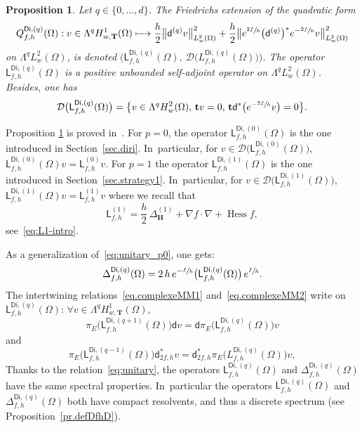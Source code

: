 \documentclass[JEP,XML,SOM,Unicode,NoEqCountersInSection,NoFloatCountersInSection,published]{cedram}
\newcommand\mto{\mathchoice{\longmapsto}{\mapsto}{\mapsto}{\mapsto}}
\newcommand{\mbf}[1]{\mathbf{#1}}
\DeclareMathOperator{\hess}{Hess}\let\Hess\hess
\theoremstyle{plain}
\newtheorem{proposition}{Proposition}
\theoremstyle{definition}
\begin{document}
\begin{proposition} \label{Lp}
Let $q\in \{0,\ldots,d\}$.
The Friedrichs extension of the quadratic form
\[
Q_{f,h}^{\mathsf{Di},(q)}(\Omega): v \in \Lambda^q H^1_{w,\mbf T}(\Omega)\mto \frac{h}{2}
\big\Vert \mathsf d^{(q)}v\big \Vert_{ L^2_w(\Omega)}^2
+\frac{h}{2}\big \Vert
e^{\sfrac{2f}{h}} \bigl(\mathsf d^{(q)}\bigr)^* e^{-\sfrac{2f}{h}} v\big \Vert_{ L^2_w(\Omega)}^2
\]
on $\Lambda^qL^2_w(\Omega)$, is denoted
$\bigl(\mathsf L^{\mathsf{Di},(q)}_{f,h}(\Omega), \ \mathcal
D\bigl(L^{\mathsf{Di},(q)}_{f,h}(\Omega)\bigr)\bigr)$. The operator $\mathsf L^{\mathsf{Di},(q)}_{f,h}(\Omega)$ is a positive unbounded self-adjoint operator on $\Lambda^qL^2_w(\Omega)$. Besides, one has
\[
\mathcal D\bigl(\mathsf L^{\mathsf{Di},(q)}_{f,h}(\Omega)\bigr)=\big\{ v \in \Lambda^qH^2_w(\Omega),\, \mbf tv=0, \, \mbf t \mathsf d^*\bigl(e^{-\sfrac{2f}{h}}v\bigr)=0 \big\}.
\]
\end{proposition}

Proposition \ref{Lp} is proved in~\cite[\S2.4]{helffer-nier-06}.
For $p=0$, the operator $\mathsf L^{\mathsf{Di},(0)}_{f,h}(\Omega)$
is the one introduced in Section~\ref{sec.diri}. In~particular,
for $v\in \mathcal D\bigl(\mathsf L^{\mathsf{Di},(0)}_{f,h}(\Omega)\bigr)$,
$\mathsf L_{f,h}^{\mathsf{Di}, (0)}(\Omega)v = \mathsf L_{f,h}^{ (0)}v$.
For $p=1$ the operator $\mathsf L^{\mathsf{Di},(1)}_{f,h}(\Omega)$ is the one introduced in Section~\ref{sec.strategy1}. In~particular,
for $v\in \mathcal D\bigl(\mathsf L^{\mathsf{Di},(1)}_{f,h}(\Omega)\bigr)$,
$\mathsf L_{f,h}^{\mathsf{Di}, (1)} (\Omega)v = \mathsf L_{f,h}^{(1)} v$
where we recall that
\[
\mathsf L_{f,h}^{(1)} = \frac{h}{2}\,
\Delta^{(1)}_{\mbf H} + \nabla f \cdot \nabla + \hess f,
\]
see~\eqref{eq:L1-intro}.

As a generalization of~\eqref{eq:unitary_p0}, one gets:
\begin{equation}\label{eq:unitary}
\Delta^{\mathsf{Di},(q)}_{f,h}(\Omega) = 2\, h \, e^{-\sfrac{f}{h}} \bigl(\mathsf L^{\mathsf{Di},(q)}_{f,h}(\Omega) \bigr)\, e^{\sfrac{f}{h}}.
\end{equation}
The intertwining relations~\eqref{eq.complexeMM1} and~\eqref{eq.complexeMM2}
write on $\mathsf L_{f,h}^{\mathsf{Di},(q)}(\Omega)$: $\forall v\in \Lambda^q H^1_{w,\mbf T}(\Omega)$,
\begin{equation}\label{commutationL}
\pi_{E}\bigl(\mathsf L_{f,h}^{\mathsf{Di},(q+1)}(\Omega))\mathsf dv =\mathsf d \pi_{E}\bigl(\mathsf L_{f,h}^{\mathsf{Di},(q)}(\Omega))v
\end{equation}
and
\begin{equation}\label{commutationL2}
\pi_{E}\bigl(\mathsf L_{f,h}^{\mathsf{Di},(q-1)}(\Omega) \bigr)\mathsf d_{2f,h}^{*} v= \mathsf d^{*}_{2f,h} \pi_{E}\bigl(L_{f,h}^{\mathsf{Di},(q)}(\Omega)\bigr)v,
\end{equation}
Thanks to the relation~\eqref{eq:unitary}, the operators
$\mathsf L_{f,h}^{\mathsf{Di},(q)}(\Omega)$ and $\Delta^{\mathsf{Di},(q)}_{f,h}(\Omega)$ have the
same spectral properties. In~particular the operators
$\mathsf L_{f,h}^{\mathsf{Di},(q)}(\Omega)$ and $\Delta^{\mathsf{Di},(q)}_{f,h}(\Omega)$ both have
compact resolvents, and thus a discrete spectrum (see Proposition~\ref{pr.defDfhD}).
\end{document}
